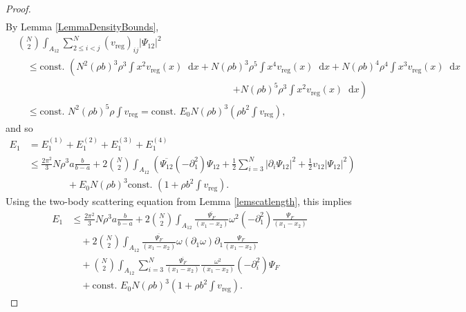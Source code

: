 \documentclass[a4paper,11pt]{article}
\newcommand{\abs}[1]{\left\lvert #1 \right\rvert}
\newcommand*\diff{\mathop{}\!\mathrm{d}}
\numberwithin{equation}{section}
\begin{document}
\begin{proof}
\begin{equation}
\begin{aligned}
		\end{aligned}
		\end{equation}
		By Lemma \ref{LemmaDensityBounds}, 
		\begin{equation}
		\begin{aligned}
		&\binom{N}{2}\int_{A_{12}} \sum_{2\leq i<j}^{N}(v_{\text{reg}})_{ij}\abs{\Psi_{12}}^2\\&\quad\leq \text{const. } \left(N^2(\rho b)^3\rho^3\int x^2 v_{\text{reg}}(x)\diff x+N(\rho b)^3 \rho^5 \int x^4 v_{\text{reg}}(x)\diff x+N(\rho b)^4\rho^4 \int x^3 v_{\text{reg}}(x)\diff x\right.\\
		&\qquad \qquad \qquad \qquad\hspace{6cm}\left.+N(\rho b)^5 \rho^3 \int x^2 v_{\text{reg}}(x)\diff x\right)\\
		&\quad \leq \text{const. } N^2(\rho b)^5\rho \int v_{\text{reg}}=\text{const. }E_0 N (\rho b)^3 \left(\rho b^2\int v_{\text{reg}}\right),
		\end{aligned}
		\end{equation}
		and so \begin{equation}
		\begin{aligned}
		E_1&=E_1^{(1)}+E_1^{(2)}+E_1^{(3)}+E_1^{(4)}\\&\leq \frac{2\pi^2}{3}N\rho^3 a\frac{b}{b-a}+2\binom{N}{2}\int_{A_{12}}\left(\overline{\Psi_{12}}(-\partial^2_1)\Psi_{12}+\frac{1}{2}\sum_{i=3}^{N}\abs{\partial_i\Psi_{12}}^2+\frac{1}{2}v_{12}\abs{\Psi_{12}}^2\right)\\&\qquad \qquad +E_0N(\rho b)^3\text{const. }\left(1+\rho b^2 \int v_{\text{reg}}\right).
		\end{aligned}
		\end{equation}
		Using the two-body scattering equation from Lemma \ref{lemscatlength}, this implies \begin{equation}
		\begin{aligned}
		E_1&\leq \frac{2\pi^2}{3}N\rho^3 a\frac{b}{b-a}+2\binom{N}{2}\int_{A_{12}}\frac{\overline{\Psi_F}}{(x_1-x_2)}\omega^2(-\partial^2_1)\frac{\Psi_F}{(x_1-x_2)}\\&\quad+2\binom{N}{2}\int_{A_{12}}\frac{\overline{\Psi_F}}{(x_1-x_2)}\omega(\partial_1\omega)\partial_1\frac{\Psi_F}{(x_1-x_2)}\\
		&\quad +\binom{N}{2}\int_{A_{12}}\sum_{i=3}^{N} \frac{\overline{\Psi_F}}{(x_1-x_2)}\frac{\omega^2}{(x_1-x_2)}(-\partial^2_i)\Psi_F
		\\&\quad+\text{const. }E_0 N (\rho b)^3 \left(1+\rho b^2\int v_{\text{reg}}\right).
		\end{aligned}

\end{equation}
\end{proof}
\end{document}
